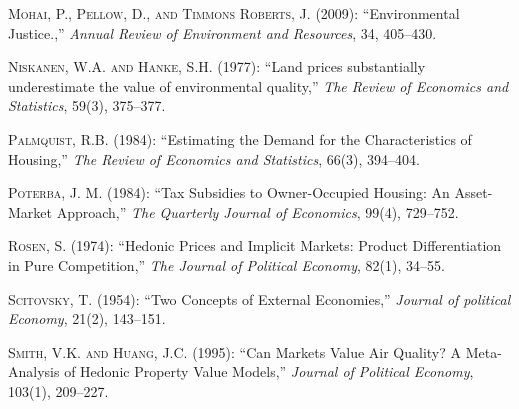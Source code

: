 \documentclass[ecta,nameyear,draft]{econsocart}
\theoremstyle{plain}
\theoremstyle{remark}
\begin{document}
\begin{thebibliography}{}
\textsc{Mohai, P., Pellow, D., and Timmons Roberts, J.} (2009):
``Environmental Justice.,''
\textit{Annual Review of Environment and Resources}, 34, 405--430.
\endbibitem

\textsc{Niskanen, W.A. and Hanke, S.H.} (1977):
``Land prices substantially underestimate the value of environmental quality,''
\textit{The Review of Economics and Statistics}, 59(3), 375--377.
\endbibitem

\textsc{Palmquist, R.B.} (1984):
``Estimating the Demand for the Characteristics of Housing,''
\textit{The Review of Economics and Statistics}, 66(3), 394--404.
\endbibitem



\textsc{Poterba, J. M.} (1984):
``Tax Subsidies to Owner-Occupied Housing: An Asset-Market Approach,''
\textit{The Quarterly Journal of Economics}, 99(4), 729--752.
\endbibitem

\textsc{Rosen, S.} (1974):
``Hedonic Prices and Implicit Markets: Product Differentiation in Pure Competition,''
\textit{The Journal of Political Economy}, 82(1), 34--55.
\endbibitem


\textsc{Scitovsky, T.} (1954):
``Two Concepts of External Economies,''
\textit{Journal of political Economy}, 21(2), 143--151.
\endbibitem


\textsc{Smith, V.K. and Huang, J.C.} (1995):
``Can Markets Value Air Quality? A Meta-Analysis of Hedonic Property Value Models,''
\textit{Journal of Political Economy}, 103(1), 209--227.
\endbibitem



\end{thebibliography}
\end{document}
